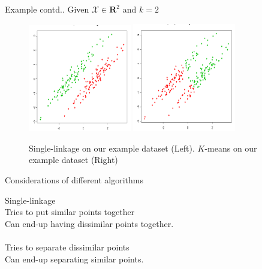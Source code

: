 \documentclass{beamer}
\newcommand{\mc}{\mathcal}
\newcommand{\mb}{\mathbf}
\begin{document}
\begin{frame}{Example contd..}
	Given $\mc X \in \mb R^2$ and $k = 2$
	\begin{center}
	\begin{figure}
	\includegraphics[trim={0 0 0 20},clip,width=0.4\textwidth]{figures/slX.png}
	\includegraphics[trim={0 0 0 20},clip,width=0.4\textwidth]{figures/kmeansX.png}
	\caption{Single-linkage on our example dataset (Left). $K$-means on our example dataset (Right)}
	\end{figure}
	\end{center}
\end{frame}

\begin{frame}{Considerations of different algorithms}
	
	{\color{blue}Single-linkage}\\
	\vspace{0.3cm}Tries to put \alert{similar} points together\\
	\vspace{0.3cm}Can end-up having dissimilar points together.\\
	
	\\
	\vspace{0.3cm}Tries to \alert{separate} dissimilar points\\
	\vspace{0.3cm}Can end-up separating similar points.\\
	
\end{frame}
\end{document}
